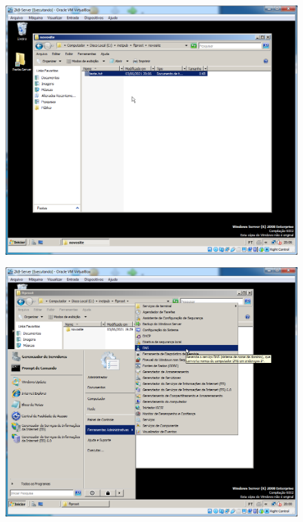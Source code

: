 \documentclass[10pt]{article}
\begin{document}
\begin{figure}[H]
    \centering
    \caption{}
    \label{fig:5413}
    \includegraphics[width=\linewidth]{images/windows_server/ftp/003.png}
\end{figure}
\begin{figure}[H]
    \centering
    \caption{}
    \label{fig:5414}
    \includegraphics[width=\linewidth]{images/windows_server/ftp/007.png}
\end{figure}
\end{document}

